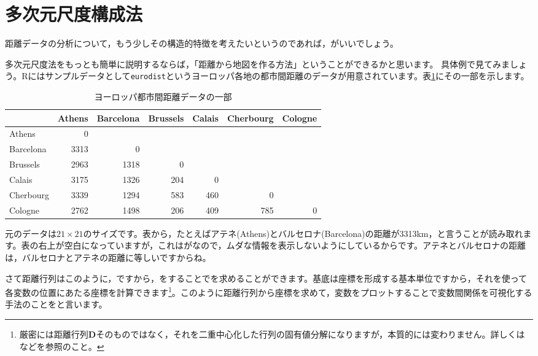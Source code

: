 \documentclass{ltjsbook}
\begin{document}
\section{多次元尺度構成法}
距離データの分析について，もう少しその構造的特徴を考えたいというのであれば，がいいでしょう。

多次元尺度法をもっとも簡単に説明するならば，「距離から地図を作る方法」ということができるかと思います。
具体例で見てみましょう。Rにはサンプルデータとして\texttt{eurodist}というヨーロッパ各地の都市間距離のデータが用意されています。表\ref{tbl::15_01}にその一部を示します。

\begin{table}[ht]
    \centering
    \caption{ヨーロッパ都市間距離データの一部}
    \begin{tabular}{l|rrrrrr}
                  & Athens & Barcelona & Brussels & Calais & Cherbourg & Cologne \\
        \hline
        Athens    & 0      &           &          &        &           &         \\
        Barcelona & 3313   & 0         &          &        &           &         \\
        Brussels  & 2963   & 1318      & 0        &        &           &         \\
        Calais    & 3175   & 1326      & 204      & 0      &           &         \\
        Cherbourg & 3339   & 1294      & 583      & 460    & 0         &         \\
        Cologne   & 2762   & 1498      & 206      & 409    & 785       & 0       \\
        \hline
    \end{tabular}
    \label{tbl::15_01}
\end{table}

元のデータは$21 \times 21$のサイズです。表から，たとえばアテネ(Athens)とバルセロナ(Barcelona)の距離が3313km，と言うことが読み取れます。表の右上が空白になっていますが，これはがなので，ムダな情報を表示しないようにしているからです。アテネとバルセロナの距離は，バルセロナとアテネの距離に等しいですからね。

さて距離行列はこのように，ですから，をすることでを求めることができます。基底は座標を形成する基本単位ですから，それを使って各変数の位置にあたる座標を計算できます\footnote{厳密には距離行列$\bm{D}$そのものではなく，それを二重中心化した行列の固有値分解になりますが，本質的には変わりません。詳しくは\citet{Okada19940115}などを参照のこと。}。このように距離行列から座標を求めて，変数をプロットすることで変数間関係を可視化する手法のことをと言います。
\end{document}
